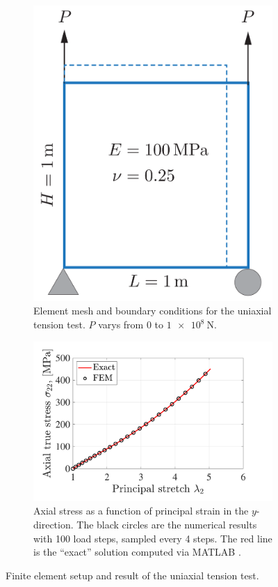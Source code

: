 \begin{figure}[!ht]
\centering
\begin{subfigure}{0.35\textwidth}
    \centering
    \includegraphics[width=\textwidth]{final/part1/final1_test_setup.pdf}
    \caption{Element mesh and boundary conditions for the uniaxial tension test. $P$ varys from $0$ to $\qty{1e8}{\newton}$. }
\end{subfigure}
\begin{subfigure}{0.55\textwidth}
    \centering
    \includegraphics[width=\textwidth]{final/part1/final1_test.pdf}
    \caption{Axial stress as a function of principal strain in the $y$-direction. The black circles are the numerical results with 100 load steps, sampled every 4 steps. The red line is the ``exact'' solution computed via MATLAB .}
\end{subfigure}
\caption{Finite element setup and result of the uniaxial tension test. }
\label{fig:final1_test}
\end{figure}

